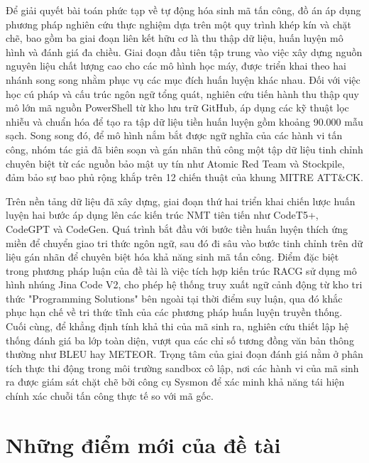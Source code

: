 Để giải quyết bài toán phức tạp về tự động hóa sinh mã tấn công, đồ án áp dụng phương pháp nghiên cứu thực nghiệm dựa trên một quy trình khép kín và chặt chẽ, bao gồm ba giai đoạn liên kết hữu cơ là thu thập dữ liệu, huấn luyện mô hình và đánh giá đa chiều. Giai đoạn đầu tiên tập trung vào việc xây dựng nguồn nguyên liệu chất lượng cao cho các mô hình học máy, được triển khai theo hai nhánh song song nhằm phục vụ các mục đích huấn luyện khác nhau. Đối với việc học cú pháp và cấu trúc ngôn ngữ tổng quát, nghiên cứu tiến hành thu thập quy mô lớn mã nguồn PowerShell từ kho lưu trữ GitHub, áp dụng các kỹ thuật lọc nhiễu và chuẩn hóa để tạo ra tập dữ liệu tiền huấn luyện gồm khoảng 90.000 mẫu sạch. Song song đó, để mô hình nắm bắt được ngữ nghĩa của các hành vi tấn công, nhóm tác giả đã biên soạn và gán nhãn thủ công một tập dữ liệu tinh chỉnh chuyên biệt từ các nguồn bảo mật uy tín như Atomic Red Team và Stockpile, đảm bảo sự bao phủ rộng khắp trên 12 chiến thuật của khung MITRE ATT\&CK.

Trên nền tảng dữ liệu đã xây dựng, giai đoạn thứ hai triển khai chiến lược huấn luyện hai bước áp dụng lên các kiến trúc NMT tiên tiến như CodeT5+, CodeGPT và CodeGen. Quá trình bắt đầu với bước tiền huấn luyện thích ứng miền để chuyển giao tri thức ngôn ngữ, sau đó đi sâu vào bước tinh chỉnh trên dữ liệu gán nhãn để chuyên biệt hóa khả năng sinh mã tấn công. Điểm đặc biệt trong phương pháp luận của đề tài là việc tích hợp kiến trúc RACG sử dụng mô hình nhúng Jina Code V2, cho phép hệ thống truy xuất ngữ cảnh động từ kho tri thức "Programming Solutions" bên ngoài tại thời điểm suy luận, qua đó khắc phục hạn chế về tri thức tĩnh của các phương pháp huấn luyện truyền thống. Cuối cùng, để khẳng định tính khả thi của mã sinh ra, nghiên cứu thiết lập hệ thống đánh giá ba lớp toàn diện, vượt qua các chỉ số tương đồng văn bản thông thường như BLEU hay METEOR. Trọng tâm của giai đoạn đánh giá nằm ở phân tích thực thi động trong môi trường sandbox cô lập, nơi các hành vi của mã sinh ra được giám sát chặt chẽ bởi công cụ Sysmon để xác minh khả năng tái hiện chính xác chuỗi tấn công thực tế so với mã gốc.


\section{Những điểm mới của đề tài}

